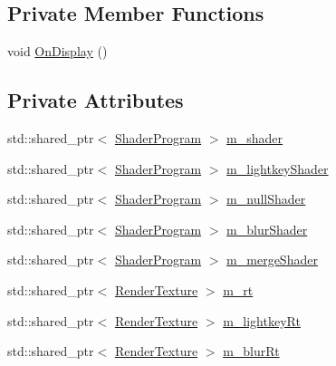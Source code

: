 \subsection*{Private Member Functions}
\begin{DoxyCompactItemize}
\item 
void \mbox{\hyperlink{classharu_1_1_mesh_renderer_ac927c9cc1d392ca8305ca995ddc0b7a6}{On\+Display}} ()
\end{DoxyCompactItemize}
\subsection*{Private Attributes}
\begin{DoxyCompactItemize}
\item 
std\+::shared\+\_\+ptr$<$ \mbox{\hyperlink{classharu_1_1_shader_program}{Shader\+Program}} $>$ \mbox{\hyperlink{classharu_1_1_mesh_renderer_a362bf54c45c36b194f1421ffc154f034}{m\+\_\+shader}}
\item 
std\+::shared\+\_\+ptr$<$ \mbox{\hyperlink{classharu_1_1_shader_program}{Shader\+Program}} $>$ \mbox{\hyperlink{classharu_1_1_mesh_renderer_a1b7b13260f00ea7e57df2d7c78c862bc}{m\+\_\+lightkey\+Shader}}
\item 
std\+::shared\+\_\+ptr$<$ \mbox{\hyperlink{classharu_1_1_shader_program}{Shader\+Program}} $>$ \mbox{\hyperlink{classharu_1_1_mesh_renderer_a08d71f5b79e9292aa3123443a4daa621}{m\+\_\+null\+Shader}}
\item 
std\+::shared\+\_\+ptr$<$ \mbox{\hyperlink{classharu_1_1_shader_program}{Shader\+Program}} $>$ \mbox{\hyperlink{classharu_1_1_mesh_renderer_afcc5562d658a94ec8905e590e9a41973}{m\+\_\+blur\+Shader}}
\item 
std\+::shared\+\_\+ptr$<$ \mbox{\hyperlink{classharu_1_1_shader_program}{Shader\+Program}} $>$ \mbox{\hyperlink{classharu_1_1_mesh_renderer_ae91deec127f7cf0093a6bf99e97f9bba}{m\+\_\+merge\+Shader}}
\item 
std\+::shared\+\_\+ptr$<$ \mbox{\hyperlink{classharu_1_1_render_texture}{Render\+Texture}} $>$ \mbox{\hyperlink{classharu_1_1_mesh_renderer_acf20639ec4df5f7aec8324c53d9cea6b}{m\+\_\+rt}}
\item 
std\+::shared\+\_\+ptr$<$ \mbox{\hyperlink{classharu_1_1_render_texture}{Render\+Texture}} $>$ \mbox{\hyperlink{classharu_1_1_mesh_renderer_a933fb51943b65589f92e0c750d4e0e9e}{m\+\_\+lightkey\+Rt}}
\item 
std\+::shared\+\_\+ptr$<$ \mbox{\hyperlink{classharu_1_1_render_texture}{Render\+Texture}} $>$ \mbox{\hyperlink{classharu_1_1_mesh_renderer_af06d5e4929335a9681cb87cdb1a4537a}{m\+\_\+blur\+Rt}}

\end{DoxyCompactItemize}
